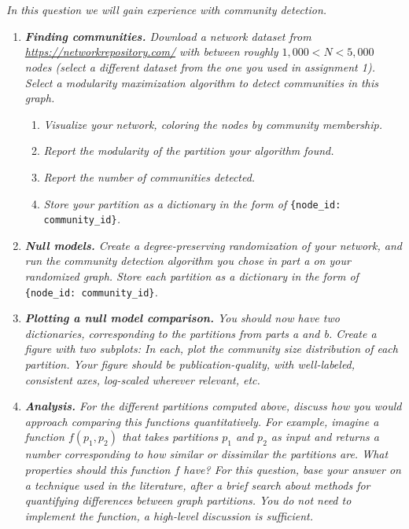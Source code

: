 \documentclass{article}
\begin{document}
\section{}
\textit{In this question we will gain experience with community detection.}
\begin{enumerate}
    \item \textit{\textbf{Finding communities.} Download a network dataset from \url{https://networkrepository.com/} with between roughly $1{,}000 < N < 5{,}000$ nodes (select a different dataset from the one you used in assignment 1). Select a modularity maximization algorithm to detect communities in this graph.}
    \begin{enumerate}
        \item \textit{Visualize your network, coloring the nodes by community membership.}
        \item \textit{Report the modularity of the partition your algorithm found.}
        \item \textit{Report the number of communities detected.}
        \item \textit{Store your partition as a dictionary in the form of }\texttt{\{node\_id: community\_id\}}\textit{.}
    \end{enumerate}
    \item \textit{\textbf{Null models.} Create a degree-preserving randomization of your network, and run the community detection algorithm you chose in part a on your randomized graph. Store each partition as a dictionary in the form of }\texttt{\{node\_id: community\_id\}}\textit{.}
    \item \textit{\textbf{Plotting a null model comparison.} You should now have two dictionaries, corresponding to the partitions from parts a and b. Create a figure with two subplots: In each, plot the community size distribution of each partition. Your figure should be publication-quality, with well-labeled, consistent axes, log-scaled wherever relevant, etc.}
    \item \textit{\textbf{Analysis.} For the different partitions computed above, discuss how you would approach comparing this functions quantitatively. For example, imagine a function $f(p_1, p_2)$ that takes partitions $p_1$ and $p_2$ as input and returns a number corresponding to how similar or dissimilar the partitions are. What properties should this function $f$ have? For this question, base your answer on a technique used in the literature, after a brief search about methods for quantifying differences between graph partitions. You do not need to implement the function, a high-level discussion is sufficient.}
\end{enumerate}
\end{document}
